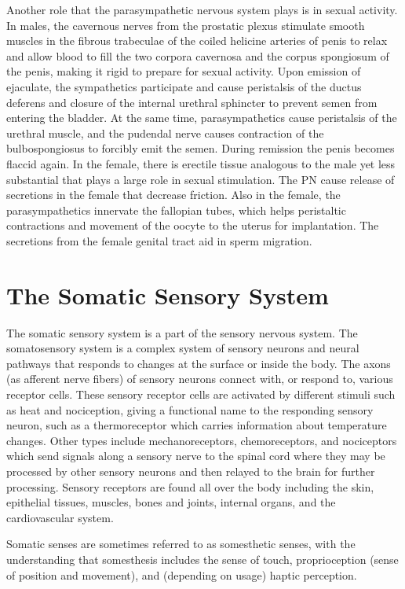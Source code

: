 \documentclass[]{book}
\begin{document}
Another role that the parasympathetic nervous system plays is in sexual activity. In males, the cavernous nerves from the prostatic plexus stimulate smooth muscles in the fibrous trabeculae of the coiled helicine arteries of penis to relax and allow blood to fill the two corpora cavernosa and the corpus spongiosum of the penis, making it rigid to prepare for sexual activity. Upon emission of ejaculate, the sympathetics participate and cause peristalsis of the ductus deferens and closure of the internal urethral sphincter to prevent semen from entering the bladder. At the same time, parasympathetics cause peristalsis of the urethral muscle, and the pudendal nerve causes contraction of the bulbospongiosus to forcibly emit the semen. During remission the penis becomes flaccid again. In the female, there is erectile tissue analogous to the male yet less substantial that plays a large role in sexual stimulation. The PN cause release of secretions in the female that decrease friction. Also in the female, the parasympathetics innervate the fallopian tubes, which helps peristaltic contractions and movement of the oocyte to the uterus for implantation. The secretions from the female genital tract aid in sperm migration.

\hypertarget{the-somatic-sensory-system}{%
\chapter{The Somatic Sensory System}\label{the-somatic-sensory-system}}

The somatic sensory system is a part of the sensory nervous system. The somatosensory system is a complex system of sensory neurons and neural pathways that responds to changes at the surface or inside the body. The axons (as afferent nerve fibers) of sensory neurons connect with, or respond to, various receptor cells. These sensory receptor cells are activated by different stimuli such as heat and nociception, giving a functional name to the responding sensory neuron, such as a thermoreceptor which carries information about temperature changes. Other types include mechanoreceptors, chemoreceptors, and nociceptors which send signals along a sensory nerve to the spinal cord where they may be processed by other sensory neurons and then relayed to the brain for further processing. Sensory receptors are found all over the body including the skin, epithelial tissues, muscles, bones and joints, internal organs, and the cardiovascular system.

Somatic senses are sometimes referred to as somesthetic senses, with the understanding that somesthesis includes the sense of touch, proprioception (sense of position and movement), and (depending on usage) haptic perception.
\end{document}
